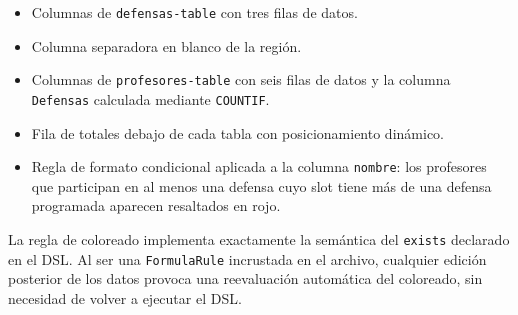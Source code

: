 \begin{itemize}
  \item Columnas de \texttt{defensas-table} con tres filas de datos.
  \item Columna separadora en blanco de la regi\'on.
  \item Columnas de \texttt{profesores-table} con seis filas de datos
    y la columna \texttt{Defensas} calculada mediante \texttt{COUNTIF}.
  \item Fila de totales debajo de cada tabla con posicionamiento din\'amico.
  \item Regla de formato condicional aplicada a la columna \texttt{nombre}:
    los profesores que participan en al menos una defensa cuyo slot tiene
    m\'as de una defensa programada aparecen resaltados en rojo.
\end{itemize}

La regla de coloreado implementa exactamente la sem\'antica del
\texttt{exists} declarado en el DSL.  Al ser una \texttt{FormulaRule}
incrustada en el archivo, cualquier edici\'on posterior de los datos provoca
una reevaluaci\'on autom\'atica del coloreado, sin necesidad de volver a
ejecutar el DSL.
